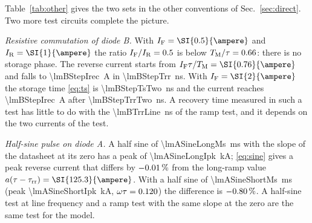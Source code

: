 \documentclass[10pt,a4paper]{scrartcl}
\newcommand{\IF}{I_\mathrm{F}}
\newcommand{\IR}{I_\mathrm{R}}
\newcommand{\taurr}{\tau_\mathrm{rr}}
\newcommand{\TM}{T_\mathrm{M}}
\begin{document}
Table~\ref{tab:other} gives the two sets in the other conventions of Sec.~\ref{sec:direct}. Two more test circuits complete the picture.

\emph{Resistive commutation of diode B.} With $\IF = \SI{\lmBStepIf}{\ampere}$ and $\IR = \SI{\lmBStepIr}{\ampere}$ the ratio $\IF/\IR = \lmBStepRatio$ is below $\TM/\tau = \lmBTmOverTau$: there is no storage phase. The reverse current starts from $\IF\tau/\TM = \SI{\lmBStepIzero}{\ampere}$ and falls to \SI{\lmBStepIrec}{\ampere} in \SI{\lmBStepTrr}{\nano\second}. With $\IF = \SI{\lmBStepIfTwo}{\ampere}$ the storage time \eqref{eq:ts} is \SI{\lmBStepTsTwo}{\nano\second} and the current reaches \SI{\lmBStepIrec}{\ampere} after \SI{\lmBStepTrrTwo}{\nano\second}. A recovery time measured in such a test has little to do with the \SI{\lmBTrrLine}{\nano\second} of the ramp test, and it depends on the two currents of the test.

\emph{Half-sine pulse on diode A.} A half sine of \SI{\lmASineLongMs}{\milli\second} with the slope of the datasheet at its zero has a peak of \SI{\lmASineLongIpk}{\kilo\ampere}; \eqref{eq:sine} gives a peak reverse current that differs by $-0.01\,\%$ from the long-ramp value $a(\tau-\taurr) = \SI{\lmALongIrr}{\ampere}$. With a half sine of \SI{\lmASineShortMs}{\milli\second} (peak \SI{\lmASineShortIpk}{\kilo\ampere}, $\omega\tau = 0.120$) the difference is $-0.80\,\%$. A half-sine test at line frequency and a ramp test with the same slope at the zero are the same test for the model.
\end{document}
